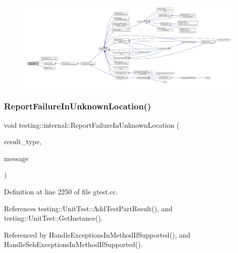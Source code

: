 \begin{figure}[H]
\begin{center}
\leavevmode
\includegraphics[width=350pt]{namespacetesting_1_1internal_a2cc0be60c54a8701423fe5297e1349ee_icgraph}
\end{center}
\end{figure}
\mbox{\label{namespacetesting_1_1internal_a85f6ff0e40f9a5f10af66a73cf1364fa}} 
\subsubsection{\texorpdfstring{Report\+Failure\+In\+Unknown\+Location()}{ReportFailureInUnknownLocation()}}
{\footnotesize\ttfamily void testing\+::internal\+::\+Report\+Failure\+In\+Unknown\+Location (\begin{DoxyParamCaption}\item[{\hyperlink{classtesting_1_1TestPartResult_a65ae656b33fdfdfffaf34858778a52d5}{Test\+Part\+Result\+::\+Type}}]{result\+\_\+type,  }\item[{const std\+::string \&}]{message }\end{DoxyParamCaption})}



Definition at line 2250 of file gtest.\+cc.



References testing\+::\+Unit\+Test\+::\+Add\+Test\+Part\+Result(), and testing\+::\+Unit\+Test\+::\+Get\+Instance().



Referenced by Handle\+Exceptions\+In\+Method\+If\+Supported(), and Handle\+Seh\+Exceptions\+In\+Method\+If\+Supported().


